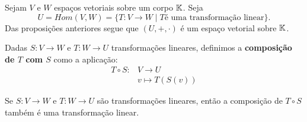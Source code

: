 \documentclass{beamer}
\begin{document}
\begin{frame}
    \begin{observacao}
        Sejam $V$ e $W$ espaços vetoriais sobre um corpo $\mathbb{K}$. Seja
        \[
            U = Hom(V, W) = \{T \colon V \to W \mid T \mbox{é uma transformação linear}\}.
        \]
        Das proposições anteriores segue que $(U, +, \cdot)$ é um espaço vetorial sobre $\mathbb{K}$.
    \end{observacao}
\end{frame}

\begin{frame}
    \begin{definicao}
        Dadas $S \colon V \to W$ e $T \colon W \to U$ transformações lineares, definimos a \textbf{composição de $T$ com $S$} como a aplicação:
        \begin{align*}
            T \circ S \colon &V \to U\\
                             &v \mapsto T(S(v))
        \end{align*}
    \end{definicao}
\end{frame}

\begin{frame}
    \begin{proposicao}
        Se $S \colon V \to W$ e $T \colon W \to U$ são transformações lineares, então a composição de $T\circ S$ também é uma transformação linear.
    \end{proposicao}
\end{frame}
\end{document}

